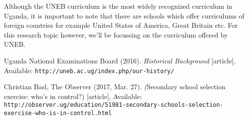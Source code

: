 \documentclass{article}
\begin{document}
Although the UNEB curriculum is the most widely recognized curriculum in Uganda, it is important to note that there are schools which offer curriculums of foreign countries for example United States of America, Great Britain etc. For this research topic however, we’ll be focussing on the curriculum offered by UNEB. \\

\begin{thebibliography}{10}

 Uganda National Examinations Board (2016).  
\emph{Historical Background} [article], 
Available:  \texttt{http://uneb.ac.ug/index.php/our-history/}

 Christian Basl, The Observer (2017, Mar. 27). 
\emph(Secondary school selection exercise: who's in control?) [article], 
Available: \texttt{http://observer.ug/education/51981-secondary-schools-selection-exercise-who-is-in-control.html}



\end{thebibliography}
\end{document}
